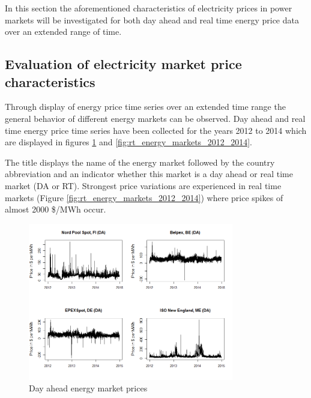 In this section the aforementioned characteristics of electricity prices in power markets will be investigated for both day ahead and real time energy price data over an extended range of time. 


\subsection{Evaluation of electricity market price characteristics}

Through display of energy price time series over an extended time range the general behavior of different energy markets can be observed. Day ahead and real time energy price time series have been collected for the years 2012 to 2014 which are displayed in figures \ref{fig:da_energy_markets_2012_2014} and \ref{fig:rt_energy_markets_2012_2014}. 

The title displays the name of the energy market followed by the country abbreviation and an indicator whether this market is a day ahead or real time market (DA or RT). Strongest price variations are experienced in real time markets (Figure \ref{fig:rt_energy_markets_2012_2014}) where price spikes of almost 2000 \$/MWh occur. 


\begin{figure}[htbp]
	\centering
		\includegraphics[width=0.8\textwidth]{figures/data_analysis/da_energy_markets_2012_2014.png}
	\caption{Day ahead energy market prices}
	\label{fig:da_energy_markets_2012_2014}
\end{figure}

